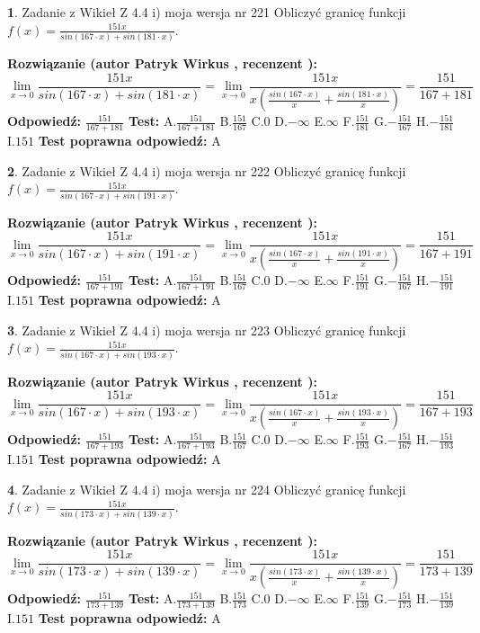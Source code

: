 \documentclass[12pt, a4paper]{article}
\theoremstyle{definition} %
\newtheorem{zad}{}
\newcommand{\zadStart}[1]{\begin{zad}#1\newline}
\newcommand{\zadStop}{\end{zad}}
\newcommand{\rozwStart}[2]{\noindent \textbf{Rozwiązanie (autor #1 , recenzent #2): }\newline}
\newcommand{\rozwStop}{\newline}
\newcommand{\odpStart}{\noindent \textbf{Odpowiedź:}\newline}
\newcommand{\odpStop}{\newline}
\newcommand{\testStart}{\noindent \textbf{Test:}\newline}
\newcommand{\testStop}{\newline}
\newcommand{\kluczStart}{\noindent \textbf{Test poprawna odpowiedź:}\newline}
\newcommand{\kluczStop}{\newline}
\begin{document}
\zadStart{Zadanie z Wikieł Z 4.4 i) moja wersja nr 221}
Obliczyć granicę funkcji $f(x)=\frac{151x}{sin(167\cdot x) +sin(181\cdot x)}$.
\zadStop
\rozwStart{Patryk Wirkus}{}
$$\lim\limits_{x\to 0}\frac{151x}{sin(167\cdot x) +sin(181\cdot x)}=\lim\limits_{x\to 0}\frac{151x}{x(\frac{sin(167\cdot x)}{x}+\frac{sin(181\cdot x)}{x})}=\frac{151}{167+181}$$
\rozwStop
\odpStart
$\frac{151}{167+181}$
\odpStop
\testStart
A.$\frac{151}{167+181}$
B.$\frac{151}{167}$
C.$0$
D.$-\infty$
E.$\infty$
F.$\frac{151}{181}$
G.$-\frac{151}{167}$
H.$-\frac{151}{181}$
I.$151$
\testStop
\kluczStart
A
\kluczStop



\zadStart{Zadanie z Wikieł Z 4.4 i) moja wersja nr 222}
Obliczyć granicę funkcji $f(x)=\frac{151x}{sin(167\cdot x) +sin(191\cdot x)}$.
\zadStop
\rozwStart{Patryk Wirkus}{}
$$\lim\limits_{x\to 0}\frac{151x}{sin(167\cdot x) +sin(191\cdot x)}=\lim\limits_{x\to 0}\frac{151x}{x(\frac{sin(167\cdot x)}{x}+\frac{sin(191\cdot x)}{x})}=\frac{151}{167+191}$$
\rozwStop
\odpStart
$\frac{151}{167+191}$
\odpStop
\testStart
A.$\frac{151}{167+191}$
B.$\frac{151}{167}$
C.$0$
D.$-\infty$
E.$\infty$
F.$\frac{151}{191}$
G.$-\frac{151}{167}$
H.$-\frac{151}{191}$
I.$151$
\testStop
\kluczStart
A
\kluczStop



\zadStart{Zadanie z Wikieł Z 4.4 i) moja wersja nr 223}
Obliczyć granicę funkcji $f(x)=\frac{151x}{sin(167\cdot x) +sin(193\cdot x)}$.
\zadStop
\rozwStart{Patryk Wirkus}{}
$$\lim\limits_{x\to 0}\frac{151x}{sin(167\cdot x) +sin(193\cdot x)}=\lim\limits_{x\to 0}\frac{151x}{x(\frac{sin(167\cdot x)}{x}+\frac{sin(193\cdot x)}{x})}=\frac{151}{167+193}$$
\rozwStop
\odpStart
$\frac{151}{167+193}$
\odpStop
\testStart
A.$\frac{151}{167+193}$
B.$\frac{151}{167}$
C.$0$
D.$-\infty$
E.$\infty$
F.$\frac{151}{193}$
G.$-\frac{151}{167}$
H.$-\frac{151}{193}$
I.$151$
\testStop
\kluczStart
A
\kluczStop



\zadStart{Zadanie z Wikieł Z 4.4 i) moja wersja nr 224}
Obliczyć granicę funkcji $f(x)=\frac{151x}{sin(173\cdot x) +sin(139\cdot x)}$.
\zadStop
\rozwStart{Patryk Wirkus}{}
$$\lim\limits_{x\to 0}\frac{151x}{sin(173\cdot x) +sin(139\cdot x)}=\lim\limits_{x\to 0}\frac{151x}{x(\frac{sin(173\cdot x)}{x}+\frac{sin(139\cdot x)}{x})}=\frac{151}{173+139}$$
\rozwStop
\odpStart
$\frac{151}{173+139}$
\odpStop
\testStart
A.$\frac{151}{173+139}$
B.$\frac{151}{173}$
C.$0$
D.$-\infty$
E.$\infty$
F.$\frac{151}{139}$
G.$-\frac{151}{173}$
H.$-\frac{151}{139}$
I.$151$
\testStop
\kluczStart
A
\kluczStop
\end{document}
